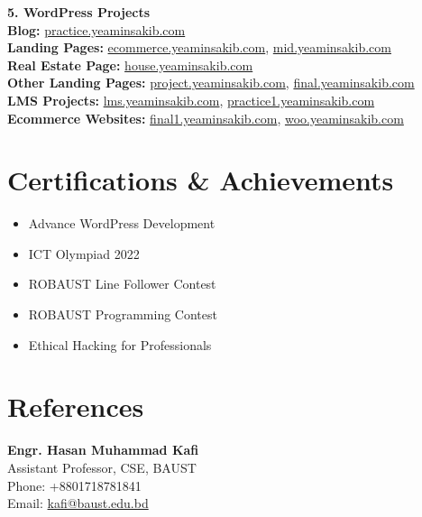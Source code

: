 \documentclass[a4paper,10pt]{article}
\begin{document}
\begin{multicols}{2}
\begin{flushleft}
        \vspace{0.3em}
        \noindent \textbf{5. WordPress Projects} \\
        \textbf{Blog:} \href{https://practice.yeaminsakib.com}{practice.yeaminsakib.com} \\
        \textbf{Landing Pages:} \href{https://ecommerce.yeaminsakib.com}{ecommerce.yeaminsakib.com}, \href{https://mid.yeaminsakib.com}{mid.yeaminsakib.com} \\
        \textbf{Real Estate Page:} \href{https://house.yeaminsakib.com}{house.yeaminsakib.com} \\
        \textbf{Other Landing Pages:} \href{https://project.yeaminsakib.com}{project.yeaminsakib.com}, \href{https://final.yeaminsakib.com}{final.yeaminsakib.com} \\
        \textbf{LMS Projects:} \href{https://lms.yeaminsakib.com}{lms.yeaminsakib.com}, \href{https://practice1.yeaminsakib.com}{practice1.yeaminsakib.com} \\
        \textbf{Ecommerce Websites:} \href{https://final1.yeaminsakib.com}{final1.yeaminsakib.com}, \href{https://woo.yeaminsakib.com}{woo.yeaminsakib.com}

        \section*{Certifications \& Achievements}
        \begin{itemize}[left=0em, labelsep=1em, label=\textbullet, itemsep=0.2em]
            \item Advance WordPress Development
            \item ICT Olympiad 2022
            \item ROBAUST Line Follower Contest
            \item ROBAUST Programming Contest
            \item Ethical Hacking for Professionals
        \end{itemize}

        \section*{References}
        \noindent \textbf{Engr. Hasan Muhammad Kafi} \\
        Assistant Professor, CSE, BAUST \\
        Phone: +8801718781841 \\
        Email: \href{mailto:kafi@baust.edu.bd}{kafi@baust.edu.bd}
    \end{flushleft}
\end{multicols}
\end{document}
